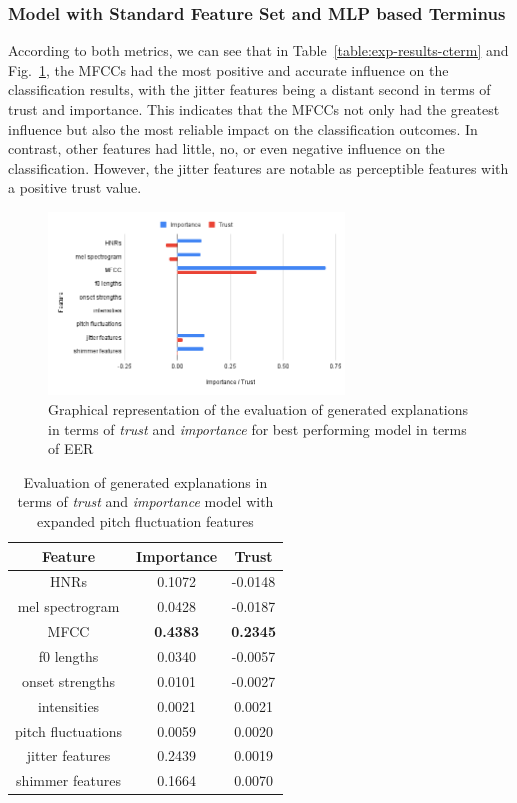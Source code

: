 \documentclass{article}
\begin{document}
\subsubsection{Model with Standard Feature Set and MLP based Terminus}
According to both metrics, we can see that in Table~\ref{table:exp-results-cterm} and Fig.~\ref{fig:exp_cterm}, the MFCCs had the most positive and accurate influence on the classification results, with the jitter features being a distant second in terms of trust and importance. This indicates that the MFCCs not only had the greatest influence but also the most reliable impact on the classification outcomes. In contrast, other features had little, no, or even negative influence on the classification. However, the jitter features are notable as perceptible features with a positive trust value.
\begin{figure}
			\centering
			\includegraphics[width=0.7\textwidth]{images/exp_cterm.png}
			\caption{Graphical representation of the evaluation of generated explanations in terms of \textit{trust} and \textit{importance} for best performing model in terms of EER}
			\label{fig:exp_cterm}
		\end{figure}
        
\begin{table}[htbp]
			\caption{Evaluation of generated explanations in terms of \textit{trust} and \textit{importance} model with expanded pitch fluctuation features}
			\vspace{10pt}
			\centering
			\begin{tabular}{|c | c | c|}
				\hline
				\textbf{Feature} & \textbf{Importance} & \textbf{Trust} \\
				\hline
				HNRs & 0.1072 & -0.0148 \\ \hline
				mel spectrogram & 0.0428 & -0.0187 \\ \hline
				MFCC & \textbf{0.4383} & \textbf{0.2345} \\ \hline
				f0 lengths & 0.0340 & -0.0057 \\ \hline
				onset strengths & 0.0101 & -0.0027 \\ \hline
				intensities & 0.0021 & 0.0021 \\ \hline
				pitch fluctuations & 0.0059 & 0.0020 \\ \hline
				jitter features & 0.2439 & 0.0019 \\ \hline
				shimmer features & 0.1664 & 0.0070 \\ \hline
			\end{tabular}
			\label{table:exp-results-more-pitch-flucs}
		\end{table}	
\end{document}
